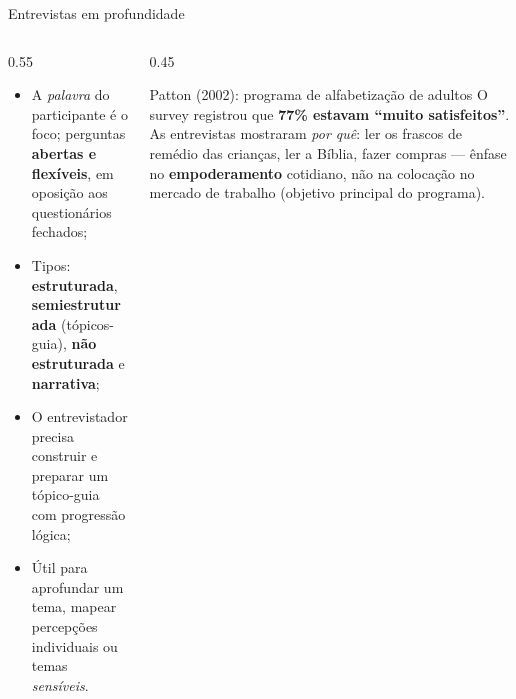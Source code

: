 \begin{frame}{Entrevistas em profundidade}
  \begin{columns}[T]
    \begin{column}{0.55\textwidth}
      \begin{itemize}
        \item A \emph{palavra} do participante é o foco; perguntas \textbf{abertas e flexíveis}, em oposição aos questionários fechados;
        \item Tipos: \textbf{estruturada}, \textbf{semiestruturada} (tópicos-guia), \textbf{não estruturada} e \textbf{narrativa};
        \item O entrevistador precisa construir  e preparar um tópico-guia com progressão lógica;
        \item Útil para aprofundar um tema, mapear percepções individuais ou temas \emph{sensíveis}.
      \end{itemize}
    \end{column}
    \begin{column}{0.45\textwidth}
      \begin{block}{Patton (2002): programa de alfabetização de adultos}
        \footnotesize
        O survey registrou que \textbf{77\% estavam ``muito satisfeitos''}. As entrevistas mostraram \emph{por quê}: ler os frascos de remédio das crianças, ler a Bíblia, fazer compras --- ênfase no \textbf{empoderamento} cotidiano, não na colocação no mercado de trabalho (objetivo principal do programa).
      \end{block}
    \end{column}
  \end{columns}
\end{frame}

